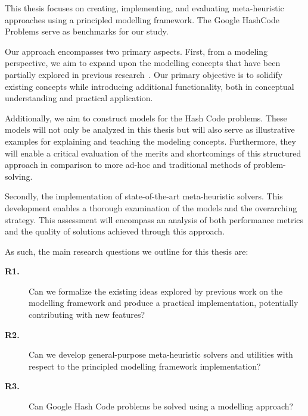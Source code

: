 This thesis focuses on creating, implementing, and evaluating meta-heuristic
approaches using a principled modelling framework. The Google HashCode Problems
serve as benchmarks for our study.

Our approach encompasses two primary aspects. First, from a modeling
perspective, we aim to expand upon the modelling concepts that have been
partially explored in previous
research~\cite{vieira2009uma,fonseca2021nasf4nio,outeiro2021application}. Our
primary objective is to solidify existing concepts while introducing additional
functionality, both in conceptual understanding and practical application.

Additionally, we aim to construct models for the Hash Code problems. These
models will not only be analyzed in this thesis but will also serve as
illustrative examples for explaining and teaching the modeling concepts.
Furthermore, they will enable a critical evaluation of the merits and
shortcomings of this structured approach in comparison to more ad-hoc and
traditional methods of problem-solving.

Secondly, the implementation of state-of-the-art meta-heuristic solvers. This
development enables a thorough examination of the models and the overarching
strategy. This assessment will encompass an analysis of both performance metrics
and the quality of solutions achieved through this approach.

As such, the main research questions we outline for this thesis are:

\vspace{0.5cm}

\begin{description}
  \item[\textbf{R1.}] Can we formalize the existing ideas explored by previous
    work on the modelling framework and produce a practical implementation,
    potentially contributing with new features?

  \item[\textbf{R2.}] Can we develop general-purpose meta-heuristic solvers and
    utilities with respect to the principled modelling framework implementation?

  \item[\textbf{R3.}] Can Google Hash Code problems be solved using a modelling approach?
\end{description}